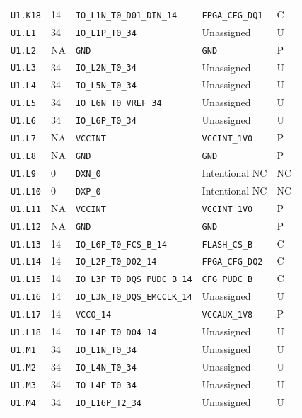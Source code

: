 \documentclass[11pt,a4paper]{article}
\begin{document}
\begin{longtable}{@{}P{20mm}P{10mm}P{75mm}P{49mm}P{7mm}@{}}
\nolinkurl{U1.K18} & 14 & \nolinkurl{IO_L1N_T0_D01_DIN_14} & \nolinkurl{FPGA_CFG_DQ1} & C \\
\nolinkurl{U1.L1} & 34 & \nolinkurl{IO_L1P_T0_34} & Unassigned & U \\
\nolinkurl{U1.L2} & NA & \nolinkurl{GND} & \nolinkurl{GND} & P \\
\nolinkurl{U1.L3} & 34 & \nolinkurl{IO_L2N_T0_34} & Unassigned & U \\
\nolinkurl{U1.L4} & 34 & \nolinkurl{IO_L5N_T0_34} & Unassigned & U \\
\nolinkurl{U1.L5} & 34 & \nolinkurl{IO_L6N_T0_VREF_34} & Unassigned & U \\
\nolinkurl{U1.L6} & 34 & \nolinkurl{IO_L6P_T0_34} & Unassigned & U \\
\nolinkurl{U1.L7} & NA & \nolinkurl{VCCINT} & \nolinkurl{VCCINT_1V0} & P \\
\nolinkurl{U1.L8} & NA & \nolinkurl{GND} & \nolinkurl{GND} & P \\
\nolinkurl{U1.L9} & 0 & \nolinkurl{DXN_0} & Intentional NC & NC \\
\nolinkurl{U1.L10} & 0 & \nolinkurl{DXP_0} & Intentional NC & NC \\
\nolinkurl{U1.L11} & NA & \nolinkurl{VCCINT} & \nolinkurl{VCCINT_1V0} & P \\
\nolinkurl{U1.L12} & NA & \nolinkurl{GND} & \nolinkurl{GND} & P \\
\nolinkurl{U1.L13} & 14 & \nolinkurl{IO_L6P_T0_FCS_B_14} & \nolinkurl{FLASH_CS_B} & C \\
\nolinkurl{U1.L14} & 14 & \nolinkurl{IO_L2P_T0_D02_14} & \nolinkurl{FPGA_CFG_DQ2} & C \\
\nolinkurl{U1.L15} & 14 & \nolinkurl{IO_L3P_T0_DQS_PUDC_B_14} & \nolinkurl{CFG_PUDC_B} & C \\
\nolinkurl{U1.L16} & 14 & \nolinkurl{IO_L3N_T0_DQS_EMCCLK_14} & Unassigned & U \\
\nolinkurl{U1.L17} & 14 & \nolinkurl{VCCO_14} & \nolinkurl{VCCAUX_1V8} & P \\
\nolinkurl{U1.L18} & 14 & \nolinkurl{IO_L4P_T0_D04_14} & Unassigned & U \\
\nolinkurl{U1.M1} & 34 & \nolinkurl{IO_L1N_T0_34} & Unassigned & U \\
\nolinkurl{U1.M2} & 34 & \nolinkurl{IO_L4N_T0_34} & Unassigned & U \\
\nolinkurl{U1.M3} & 34 & \nolinkurl{IO_L4P_T0_34} & Unassigned & U \\
\nolinkurl{U1.M4} & 34 & \nolinkurl{IO_L16P_T2_34} & Unassigned & U \\

\end{longtable}
\end{document}
